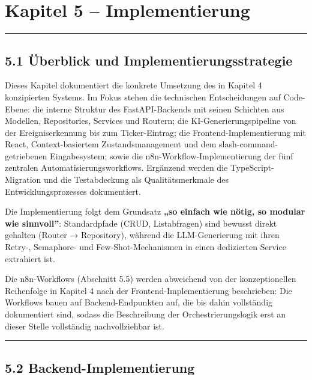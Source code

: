 \section{Kapitel 5 -- Implementierung}\label{kapitel-5-implementierung}

\begin{center}\rule{0.5\linewidth}{0.5pt}\end{center}

\subsection{5.1 Überblick und
Implementierungsstrategie}\label{uxfcberblick-und-implementierungsstrategie}

Dieses Kapitel dokumentiert die konkrete Umsetzung des in Kapitel 4
konzipierten Systems. Im Fokus stehen die technischen Entscheidungen auf
Code-Ebene: die interne Struktur des FastAPI-Backends mit seinen
Schichten aus Modellen, Repositories, Services und Routern; die
KI-Generierungspipeline von der Ereigniserkennung bis zum
Ticker-Eintrag; die Frontend-Implementierung mit React,
Context-basiertem Zustandsmanagement und dem slash-command-getriebenen
Eingabesystem; sowie die n8n-Workflow-Implementierung der fünf zentralen
Automatisierungsworkflows. Ergänzend werden die TypeScript-Migration und
die Testabdeckung als Qualitätsmerkmale des Entwicklungsprozesses
dokumentiert.

Die Implementierung folgt dem Grundsatz \textbf{„so einfach wie nötig,
so modular wie sinnvoll''}: Standardpfade (CRUD, Listabfragen) sind
bewusst direkt gehalten (Router → Repository), während die
LLM-Generierung mit ihren Retry-, Semaphore- und Few-Shot-Mechanismen in
einen dedizierten Service extrahiert ist.

Die n8n-Workflows (Abschnitt 5.5) werden abweichend von der
konzeptionellen Reihenfolge in Kapitel 4 nach der
Frontend-Implementierung beschrieben: Die Workflows bauen auf
Backend-Endpunkten auf, die bis dahin vollständig dokumentiert sind,
sodass die Beschreibung der Orchestrierungslogik erst an dieser Stelle
vollständig nachvollziehbar ist.

\begin{center}\rule{0.5\linewidth}{0.5pt}\end{center}

\subsection{5.2 Backend-Implementierung}\label{backend-implementierung}

